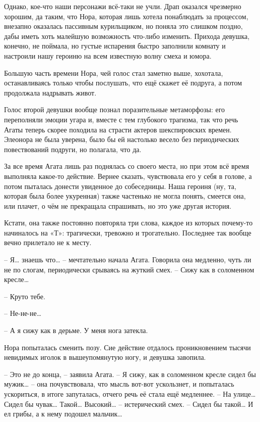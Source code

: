 \documentclass[
  a5paperpaper,
  DIV=11,
  numbers=noendperiod]{scrreprt}
\begin{document}
Однако, кое-что наши персонажи всё-таки не учли. Драп оказался чрезмерно
хорошим, да таким, что Нора, которая лишь хотела понаблюдать за
процессом, внезапно оказалась пассивным курильщиком, но поняла это
слишком поздно, дабы иметь хоть малейшую возможность что-либо изменить.
Прихода девушка, конечно, не поймала, но густые испарения быстро
заполнили комнату и настроили нашу героиню на всем известную волну смеха
и юмора.

Большую часть времени Нора, чей голос стал заметно выше, хохотала,
останавливаясь только чтобы послушать, что ещё скажет её подруга, а
потом продолжала надрывать живот.

Голос второй девушки вообще познал поразительные метаморфозы: его
переполняли эмоции угара и, вместе с тем глубокого трагизма, так что
речь Агаты теперь скорее походила на страсти актеров шекспировских
времен. Элеонора не была уверена, было бы ей настолько весело без
периодических повествований подруги, но полагала, что да.

За все время Агата лишь раз поднялась со своего места, но при этом всё
время выполняла какое-то действие. Вернее сказать, чувствовала его у
себя в голове, а потом пыталась донести увиденное до собеседницы. Наша
героиня (ну, та, которая была более укуренная) также частенько не могла
понять, смеется она, или плачет, о чём не прекращала спрашивать, но это
уже другая история.

Кстати, она также постоянно повторяла три слова, каждое из которых
почему-то начиналось на «Т»: трагически, тревожно и трогательно.
Последнее так вообще вечно прилетало не к месту.

-- Я\ldots{} знаешь что\ldots{} -- мечтательно начала Агата. Говорила
она медленно, чуть ли не по слогам, периодически срываясь на жуткий
смех. -- Сижу как в соломенном кресле\ldots{}

-- Круто тебе.

-- Не-не-не\ldots{}

-- А я сижу как в дерьме. У меня нога затекла.

Нора попыталась сменить позу. Сие действие отдалось проникновением
тысячи невидимых иголок в вышеупомянутую ногу, и девушка завопила.

-- Это не до конца, -- заявила Агата. -- Я сижу, как в соломенном кресле
сидел бы мужик\ldots{} -- она почувствовала, что мысль вот-вот
ускользнет, и попыталась ускориться, в итоге запуталась, отчего речь её
стала ещё медленнее. -- На улице\ldots{} Сидел бы чувак\ldots{}
Такой\ldots{} Высокий\ldots{} -- истерический смех. -- Сидел бы
такой\ldots{} И ел грибы, а к нему подошел мальчик\ldots{}
\end{document}
